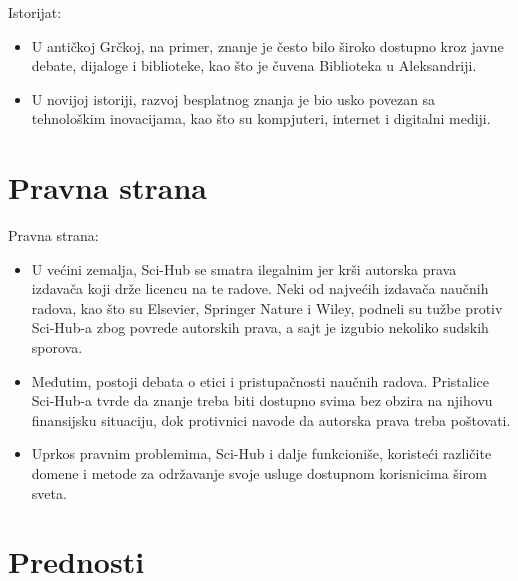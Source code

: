 \documentclass[aspectratio=1610,17pt,utf8]{beamer}
\begin{document}
	\begin{frame}{Istorijat:}
		
		\begin{itemize}
			\item U antičkoj Grčkoj, na primer, znanje je često bilo
                široko dostupno kroz javne debate, dijaloge i biblioteke, kao što je čuvena Biblioteka u Aleksandriji.
			\item U novijoj istoriji, razvoj besplatnog znanja je bio          usko povezan sa tehnološkim inovacijama, kao što su             kompjuteri, internet i digitalni mediji.

		\end{itemize}
	\end{frame}

  	\section{Pravna strana}
	
	\begin{frame}{Pravna strana:}
		
		\begin{itemize}
  	\begin{itemize}
			\item U većini zemalja, Sci-Hub se smatra ilegalnim jer krši autorska prava izdavača koji drže licencu na te radove. Neki od najvećih izdavača naučnih radova, kao što su Elsevier, Springer Nature i Wiley, podneli su tužbe protiv Sci-Hub-a zbog povrede autorskih prava, a sajt je izgubio nekoliko sudskih sporova.
			\item Međutim, postoji debata o etici i pristupačnosti naučnih radova. Pristalice Sci-Hub-a tvrde da znanje treba biti dostupno svima bez obzira na njihovu finansijsku situaciju, dok protivnici navode da autorska prava treba poštovati.
                \item Uprkos pravnim problemima, Sci-Hub i dalje funkcioniše, koristeći različite domene i metode za održavanje svoje usluge dostupnom korisnicima širom sveta.

		\end{itemize}
		\end{itemize}
	\end{frame}
 
	\section{Prednosti}
	
	
\end{document}
